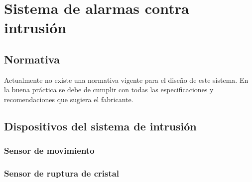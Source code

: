 %
%
%
%
%	
%	
%	
%	
%	







\newpage

\section{Sistema de alarmas contra intrusión}

\subsection{Normativa}

Actualmente no existe una normativa vigente para el diseño de este sistema. En la buena práctica se debe de cumplir con todas las especificaciones y recomendaciones que sugiera el fabricante.


\subsection{Dispositivos del sistema de intrusión}

\subsubsection{Sensor de movimiento}

\subsubsection{Sensor de ruptura de cristal}

